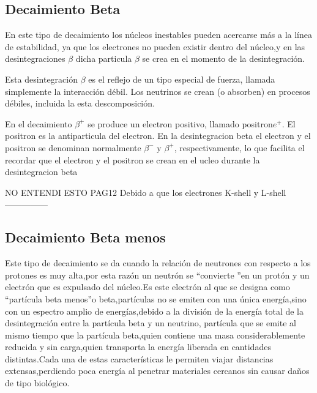 \documentclass[12pt,fleqn]{book} %
\numberwithin{equation}{section} %
\numberwithin{figure}{section} %
\numberwithin{table}{section} %
\begin{document}
\subsection{Decaimiento Beta}
En este tipo de decaimiento los núcleos inestables pueden acercarse más a la línea de estabilidad, ya que los electrones no pueden existir dentro del núcleo,y en las  desintegraciones $\beta$ dicha particula $\beta$ se crea en el momento de la desintegración. 

Esta desintegración  $\beta$ es el reflejo de un tipo especial de fuerza, llamada simplemente la interacción débil. Los neutrinos se crean (o absorben) en procesos débiles, incluida la esta descomposición.

En el decaimiento $\beta ^{+}$ se produce un electron positivo, llamado positron$e^{+}$. El positron es la antiparticula del electron. En la desintegracion beta
el electron y el positron  se denominan normalmente $\beta ^{-}$ y $\beta ^{+}$, respectivamente, lo que facilita el recordar que el electron y el positron se crean en el ucleo durante la desintegracion beta

NO ENTENDI ESTO PAG12
Debido a que los electrones K-shell y L-shell 
---------------

\subsection{Decaimiento Beta menos}
Este tipo de decaimiento se da cuando la relación de neutrones con respecto a los protones es muy alta,por esta razón un neutrón se \textquotedblleft convierte \textquotedblright en un protón y un electrón que es expulsado del núcleo.Es este electrón al que se designa como \textquotedblleft partícula beta menos\textquotedblright o beta,partículas no se emiten con una única energía,sino con un espectro amplio de energías,debido a la división de la energía total de la desintegración entre la partícula beta y un neutrino, partícula que se emite al mismo tiempo que la partícula beta,quien contiene una masa considerablemente reducida y sin carga,quien transporta la energía liberada en cantidades distintas.Cada una de estas características le permiten viajar distancias extensas,perdiendo poca energía al penetrar materiales cercanos sin causar daños de tipo biológico.



\end{document}
